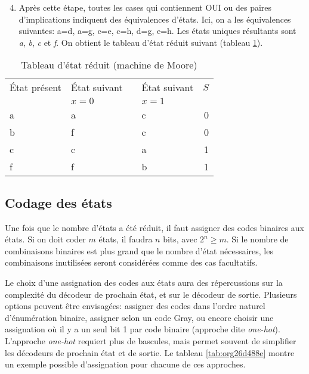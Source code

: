 \documentclass[11pt]{article}
\begin{document}
\begin{enumerate}
\setcounter{enumi}{3}
\item Après cette étape, toutes les  cases qui contiennent OUI ou des
paires d'implications indiquent des équivalences d'états. Ici, on a
les équivalences suivantes: a=d, a=g, c=e, c=h, d=g, e=h. Les états
uniques résultants sont \emph{a}, \emph{b}, \emph{c} et \emph{f}. On obtient le tableau
d'état réduit suivant (tableau \ref{tab:org9e63b29}).
\end{enumerate}

\begin{table}[htbp]
\caption{\label{tab:org9e63b29}Tableau d'état réduit (machine de Moore)}
\centering
\begin{tabular}{llllr}
État présent & État suivant &  & État suivant & \(S\)\\
 & \(x=0\) &  & \(x=1\) & \\
\hline
a & a &  & c & 0\\
b & f &  & c & 0\\
c & c &  & a & 1\\
f & f &  & b & 1\\
\end{tabular}
\end{table}


\subsection{Codage des états}
\label{sec:org869c889}

Une fois que le nombre d'états a été réduit, il faut assigner des
codes binaires aux états. Si on doit coder \(m\) états, il faudra
\(n\) bits, avec \(2^n \geq m\). Si le nombre de combinaisons
binaires est plus grand que le nombre d'état nécessaires, les
combinaisons inutilisées seront considérées comme des cas facultatifs.

Le choix d'une assignation des codes aux états aura des répercussions
sur la complexité du décodeur de prochain état, et sur le décodeur de
sortie. Plusieurs options peuvent être envisagées: assigner des codes
dans l'ordre naturel d'énumération binaire, assigner selon un code
Gray, ou encore choisir une assignation où il y a un seul bit 1 par
code binaire (approche dite \emph{one-hot}). L'approche \emph{one-hot} requiert
plus de bascules, mais permet souvent de simplifier les décodeurs de
prochain état et de sortie. Le tableau \ref{tab:org26d488e} montre
un exemple possible d'assignation pour chacune de ces approches.
\end{document}
